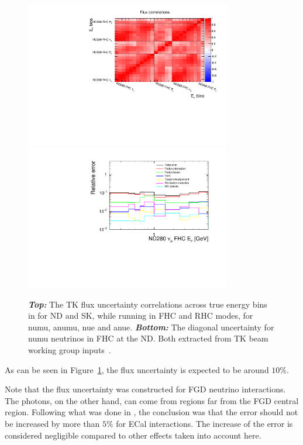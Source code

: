 \begin{figure}[ht]
  \center
  \includegraphics[width=0.8\textwidth]{T2K-TN-254/images/systematics/Flux.pdf} \\
  \includegraphics[width=0.8\textwidth]{T2K-TN-254/images/systematics/DiagError.pdf}
  \caption[T2K flux uncertainty and correlations across true energy
  bins in at ND280 and at SK]{\textbf{\textit{Top:}} The \Gls{TK} flux
    uncertainty correlations across true energy bins in for \Gls{ND}
    and \Gls{SK}, while running in \Gls{FHC} and \Gls{RHC} modes, for
    \Gls{numu}, \Gls{anumu}, \Gls{nue} and \Gls{anue}.
    \textbf{\textit{Bottom:}} The diagonal uncertainty for \Gls{numu}
    neutrinos in \Gls{FHC} at the \Gls{ND}. Both extracted from
    \Gls{TK} beam working group
    inputs~\cite{TomislavVladisavljevicFluxTuning2017,MarkHartzFluxUncertainty2017}.}
  \label{fig:fluxsystematics}
\end{figure}

As can be seen in Figure~\ref{fig:fluxsystematics}, the flux
uncertainty is expected to be around $10\%$.

Note that the flux uncertainty was constructed for \Gls{FGD} neutrino
interactions. The photons, on the other hand, can come from regions
far from the \Gls{FGD} central region. Following what was done in
\cite{MarkScott2013}, the conclusion was that the error should not be
increased by more than $5\%$ for \Gls{ECal} interactions. The increase
of the error is considered negligible compared to other effects taken
into account here.

